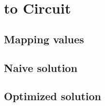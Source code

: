 \section{ to Circuit}
\label{sec:moqfa-to-circuit}

\subsection{Mapping values}


\subsection{Naive solution}
\subsection{Optimized solution}